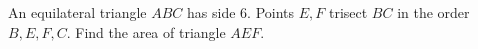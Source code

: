 An equilateral triangle $ABC$ has side $6$. Points $E,F$ trisect $BC$ in the order $B,E,F,C$. Find the area of triangle $AEF$.
